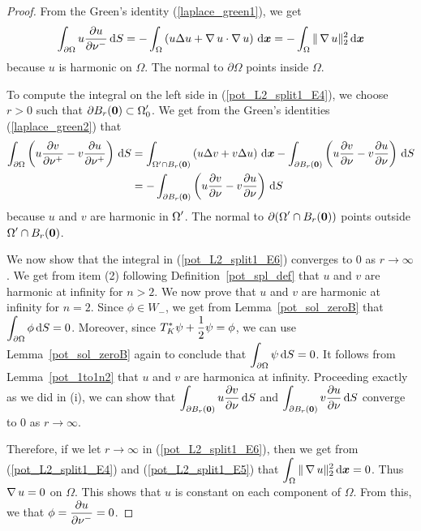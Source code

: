 \begin{proof}
From the Green's identity (\ref{laplace_green1}), we get
\begin{equation} \label{pot_L2_split1_E5}
\int_{\partial \Omega} u \frac{\partial{u}}{\partial \nu^-} \,\mathrm{d}{S} 
= -\int_{\Omega} \left( u \Delta u + \operatorname{\nabla} u \cdot \operatorname{\nabla} u \right)
\,\mathrm{d}{{\bm{x}}}
= -\int_{\Omega} \|\operatorname{\nabla} u\|_2^2 \,\mathrm{d}{{\bm{x}}}
\end{equation}
because $u$ is harmonic on $\Omega$.  The normal to $\partial \Omega$
points inside $\Omega$.

To compute the integral on the left side in (\ref{pot_L2_split1_E4}),
we choose $r>0$ such that
$\displaystyle \partial B_r({\bm{0}}) \subset \Omega_0^{\prime}$.
We get from the Green's identities (\ref{laplace_green2}) that
\begin{align}
\int_{\partial \Omega} \left( u \frac{\partial{v}}{\partial \nu^+}
- v \frac{\partial{u}}{\partial \nu^+} \right) \,\mathrm{d}{S}
&= \int_{\Omega^{\prime} \cap B_r({\bm{0}})}
\left( u \Delta v + v \Delta u \right) \,\mathrm{d}{{\bm{x}}}
- \int_{\partial B_r({\bm{0}})} \left( u \frac{\partial{v}}{\partial \nu}
- v \frac{\partial{u}}{\partial \nu} \right) \,\mathrm{d}{S}
\nonumber \\
&= - \int_{\partial B_r({\bm{0}})} \left( u \frac{\partial{v}}{\partial \nu}
- v \frac{\partial{u}}{\partial \nu} \right) \,\mathrm{d}{S}
\label{pot_L2_split1_E6}
\end{align}
because $u$ and $v$ are harmonic in $\displaystyle \Omega^{\prime}$.
The normal to $\displaystyle \partial (\Omega^{\prime} \cap B_r({\bm{0}}))$
points outside $\displaystyle \Omega^{\prime} \cap B_r({\bm{0}})$.

We now show that the integral in (\ref{pot_L2_split1_E6}) converges
to $0$ as $r \to \infty$.  We get from item (2) following
Definition~\ref{pot_spl_def} that $u$ and $v$ are harmonic at infinity for
$n>2$.  We now prove that $u$ and $v$ are harmonic at infinity for $n=2$.
Since $\phi \in W_-$, we get from Lemma~\ref{pot_sol_zeroB} that
$\displaystyle \int_{\partial \Omega} \phi \,\mathrm{d}{S} = 0$.
Moreover, since $\displaystyle T^\ast_K \psi + \frac{1}{2} \psi = \phi$,
we can use Lemma~\ref{pot_sol_zeroB} again to conclude that
$\displaystyle \int_{\partial \Omega} \psi \,\mathrm{d}{S} = 0$.
It follows from Lemma~\ref{pot_1to1n2} that $u$ and $v$ are harmonica
at infinity.  Proceeding exactly as we did in (i), we can show that
$\displaystyle \int_{\partial B_r({\bm{0}})} u \frac{\partial{v}}{\partial \nu} \,\mathrm{d}{S}$
and
$\displaystyle \int_{\partial B_r({\bm{0}})} v \frac{\partial{u}}{\partial \nu}  \,\mathrm{d}{S}$
converge to $0$ as $r \to \infty$.

Therefore, if we let $r \to \infty$ in (\ref{pot_L2_split1_E6}), then we
get from (\ref{pot_L2_split1_E4}) and (\ref{pot_L2_split1_E5}) that
$\displaystyle \int_{\Omega} \|\operatorname{\nabla} u\|_2^2 \,\mathrm{d}{{\bm{x}}} = 0$.
Thus $\operatorname{\nabla} u = 0$ on $\Omega$.  This shows that $u$ is
constant on each component of $\Omega$.  From this, we
that $\displaystyle \phi = \frac{\partial{u}}{\partial \nu^-} = 0$.
\end{proof}

